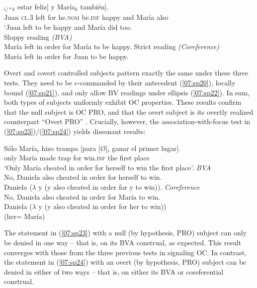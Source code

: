 \documentclass[output=paper,colorlinks,citecolor=brown,draft,draftmode]{langscibook}
\begin{document}
\begin{exe}
\ex\label{07:sp22}
\gll [Juan$_i$ se fue [para él$_{i/*k}$/ [Ø]$_{i/*k}$ estar feliz] y María$_k$ también].\\
Juan \textsc{cl.3} left for he.\textsc{nom} {} be.\textsc{inf} happy and María also\\
\glt ‘Juan left to be happy and María did too.\\
\ea\cmark Sloppy reading \textit{(BVA)}\\
 María left in order for María to be happy.
\ex\xmark Strict reading \textit{(Coreference)}\\
María left in order for Juan to be happy.
\z
\end{exe}

Overt and covert controlled subjects pattern exactly the same under these three tests. They need to be c-commanded by their antecedent (\ref{07:sp20}), locally bound (\ref{07:sp21}), and only allow BV readings under ellipsis (\ref{07:sp22}). In sum, both types of subjects uniformly exhibit OC properties. These results confirm that the null subject is OC PRO, and that the overt subject is its overtly realized counterpart ``Overt PRO'' \citep{piera87, mensching00, livitz11, livitz14}.
Crucially, however, the association-with-focus test in (\ref{07:sp23})/(\ref{07:sp24}) yields dissonant results:

\begin{exe}
\ex\label{07:sp23}
\gll Sólo María$_i$ hizo trampa [para [Ø]$_i$ ganar el primer lugar]. \\
only María made trap    for  {} win.\textsc{inf}  the first place \\
\glt ‘Only María cheated in order for herself to win the first place’.
\ea \cmark\textit{BVA}\\
No, Daniela also cheated in order for herself to win. \\
    Daniela ($\lambda$ y (y also cheated in order for y to win)).
\ex \xmark\textit{Coreference}\\
No, Daniela also cheated in order for María to win.\\
 Daniela ($\lambda$ y (y also cheated in order for her to win))\\
(her= María)\\
\z
\end{exe}

The statement in (\ref{07:sp23}) with a null (by hypothesis, PRO) subject can only be denied in one way -- that is, on its BVA construal, as expected. This result converges with those from the three previous tests in signaling OC.
In contrast, the statement in (\ref{07:sp24}) with an overt (by hypothesis, PRO) subject can be denied in either of two ways -- that is, on either its BVA or coreferential construal.
\end{document}
